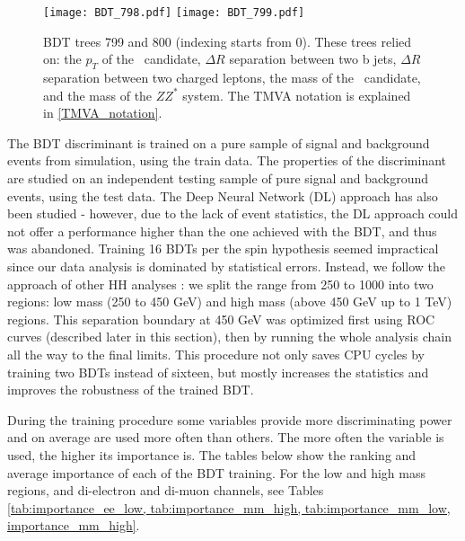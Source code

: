 \begin{figure}[H]
\begin{center}
\texttt{[image: BDT\_798.pdf]}
\texttt{[image: BDT\_799.pdf]}\\
\caption[BDT trees 799 and 800.]{BDT trees 799 and 800 (indexing starts from 0). These trees relied on: the $p_T$ of the \Zll~candidate, 
$\Delta R$ separation between two b jets,
$\Delta R$ separation between two charged leptons, 
the mass of the \HBB~candidate, and the mass of the $ZZ^*$ system. The TMVA notation is explained in \ref{TMVA_notation}.} 
\label{fig:bdt_trees_3}
\end{center}
\end{figure}

The BDT discriminant is trained on a pure sample of signal and background events from simulation, using the train data. The properties of the discriminant are studied on an independent testing sample of pure signal and background events, using the test data. The Deep Neural Network (DL) approach has also been studied - however, due to the lack of event statistics, the DL approach could not offer a performance higher than the one achieved with the BDT, and thus was abandoned. Training 16 BDTs per the spin hypothesis seemed impractical since our data analysis is dominated by statistical errors. Instead, we follow the approach of other HH analyses \cite{HH_combination}: we split the range from 250 to 1000 into two regions: low mass (250 to 450 GeV) and high mass (above 450 GeV up to 1 TeV) regions. This separation boundary at 450 GeV was optimized first using ROC curves (described later in this section), then by running the whole analysis chain all the way to the final limits. This procedure not only saves CPU cycles by training two BDTs instead of sixteen, but mostly increases the statistics and improves the robustness of the trained BDT. 

During the training procedure some variables provide more discriminating power and on average are used more often than others. The more often the variable is used, the higher its importance is. The tables below show the ranking and average importance of each of the BDT training. For the low and high mass regions, and di-electron and di-muon channels, see Tables \ref{tab:importance_ee_low, tab:importance_mm_high, tab:importance_mm_low, importance_mm_high}. 

